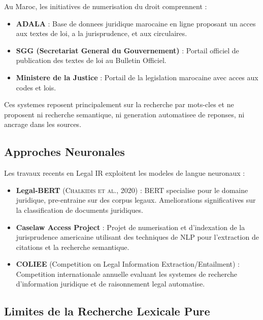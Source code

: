 Au Maroc, les initiatives de numerisation du droit comprennent :

\begin{itemize}
    \item \textbf{ADALA} : Base de donnees juridique marocaine en ligne proposant un acces aux textes de loi, a la jurisprudence, et aux circulaires.
    \item \textbf{SGG (Secretariat General du Gouvernement)} : Portail officiel de publication des textes de loi au Bulletin Officiel.
    \item \textbf{Ministere de la Justice} : Portail de la legislation marocaine avec acces aux codes et lois.
\end{itemize}

Ces systemes reposent principalement sur la recherche par mots-cles et ne proposent ni recherche semantique, ni generation automatisee de reponses, ni ancrage dans les sources.

\subsection{Approches Neuronales}

Les travaux recents en Legal IR exploitent les modeles de langue neuronaux :

\begin{itemize}
    \item \textbf{Legal-BERT} (\textsc{Chalkidis et al.}, 2020) : BERT specialise pour le domaine juridique, pre-entraine sur des corpus legaux. Ameliorations significatives sur la classification de documents juridiques.
    
    \item \textbf{Caselaw Access Project} : Projet de numerisation et d'indexation de la jurisprudence americaine utilisant des techniques de NLP pour l'extraction de citations et la recherche semantique.
    
    \item \textbf{COLIEE} (Competition on Legal Information Extraction/Entailment) : Competition internationale annuelle evaluant les systemes de recherche d'information juridique et de raisonnement legal automatise.
\end{itemize}

\subsection{Limites de la Recherche Lexicale Pure}

